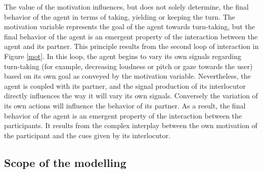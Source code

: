 The value of the motivation influences, but does not solely determine, the final behavior of the agent in terms of taking, yielding or keeping the turn. The motivation variable represents the goal of the agent towards turn-taking, but the final behavior of the agent is an emergent property of the interaction between the agent and its partner. 
This principle results from the second loop of interaction in Figure \ref{mot}. 
In this loop, the agent begins to vary its own signals regarding turn-taking (for example, decreasing loudness or pitch or gaze towards the user) based on its own goal as conveyed by the motivation variable. Nevertheless, the agent is coupled with its partner, and the signal production of its interlocutor directly influences the way it will vary its own signals.
Conversely the variation of its own actions will influence the behavior of its partner. 
As a result, the final behavior of the agent
is an emergent property of the interaction between the participants.
It results from the complex interplay between the own motivation of the participant and the cues given by its interlocutor.

\subsection{Scope of the modelling}

